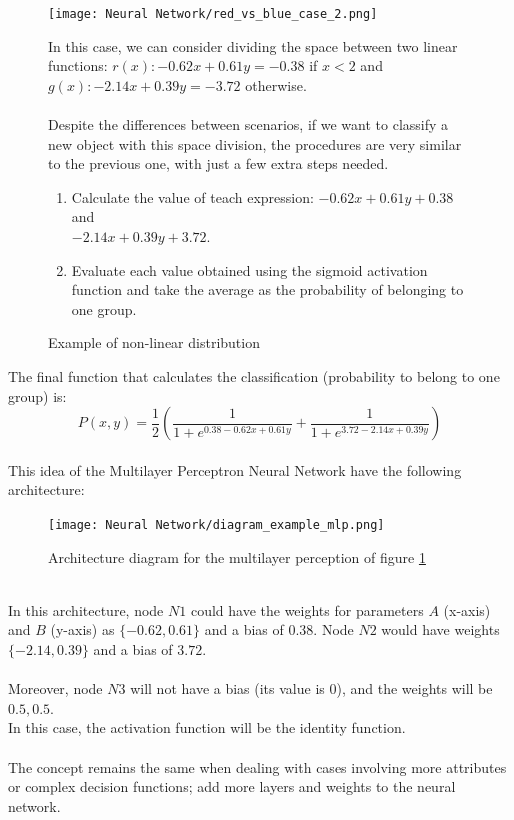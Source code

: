 \documentclass[a4paper, 11pt]{article}
\begin{document}
\begin{figure}[!h]
    \begin{minipage}{6cm}
       \begin{center}
           \texttt{[image: Neural Network/red\_vs\_blue\_case\_2.png]}
           \caption{Example of non-linear distribution}
           \label{fig-example-classification}
       \end{center} 
    \end{minipage}
    \hspace{1em}
    \begin{minipage}{8cm}
    In this case, we can consider dividing the space between two linear functions: $r(x): -0.62x + 0.61y = -0.38$ if $x < 2$ and $g(x): -2.14x + 0.39y = -3.72$ otherwise.\\\\
    Despite the differences between scenarios, if we want to classify a new object with this space division, the procedures are very similar to the previous one, with just a few extra steps needed.
    \begin{enumerate}
        \item Calculate the value of teach expression: $-0.62x+0.61y + 0.38$ and\\ $-2.14x+0.39y +3.72$.
        \item Evaluate each value obtained using the sigmoid activation function and take the average as the probability of belonging to one group. 
    \end{enumerate}
    \end{minipage}
\end{figure}\newpage
\hspace{-1.6em}The final function that calculates the classification (probability to belong to one group) is:
\begin{equation*}
    P(x,y) = \frac{1}{2} \left( \frac{1}{1+e^{0.38 -0.62x+0.61y}} + \frac{1}{1+e^{3.72-2.14x+0.39y}} \right)
\end{equation*} \\
This idea of the Multilayer Perceptron Neural Network have the following architecture: \\
\begin{figure}[h]
    \centering
    \texttt{[image: Neural Network/diagram\_example\_mlp.png]}
    \caption{Architecture diagram for the multilayer perception of figure \ref{fig-example-classification}}
    \label{fig:enter-label}
\end{figure}\\
In this architecture, node $N1$ could have the weights for parameters $A$ (x-axis) and $B$ (y-axis) as $\{-0.62, 0.61\}$ and a bias of $0.38$.
Node $N2$ would have weights $\{-2.14, 0.39\}$ and a bias of $3.72$.\\\\
Moreover, node $N3$ will not have a bias (its value is 0), and the weights will be ${0.5, 0.5}$.\\ 
In this case, the activation function will be the identity function.\\\\
The concept remains the same when dealing with cases involving more attributes or complex decision functions; add more layers and weights to the neural network.
\end{document}
